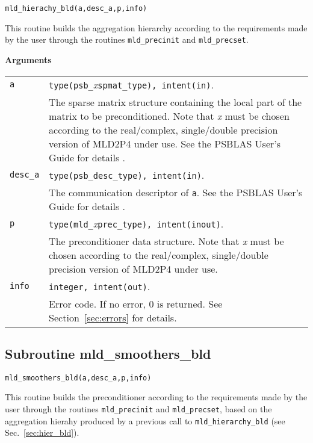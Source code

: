 \begin{center}
\verb|mld_hierachy_bld(a,desc_a,p,info)|\\
\end{center}

\noindent
This routine builds the aggregation hierarchy  according to the requirements made by
the user through the routines \verb|mld_precinit| and \verb|mld_precset|.

{\baselineskip\noindent\large\bfseries Arguments}

\begin{tabular}{p{1.2cm}p{12cm}}
\verb|a|      & \verb|type(psb_|\emph{x}\verb|spmat_type), intent(in)|. \\
              & The sparse matrix structure containing the local part of the
                matrix to be preconditioned. Note that \emph{x} must be chosen according
                to the real/complex, 
single/double precision version of MLD2P4 under use.
                See the PSBLAS User's Guide for details \cite{PSBLASGUIDE}.\\
\verb|desc_a| & \verb|type(psb_desc_type), intent(in)|. \\
              & The communication descriptor of \verb|a|. See the PSBLAS User's Guide for
                details \cite{PSBLASGUIDE}.\\
\verb|p|      & \verb|type(mld_|\emph{x}\verb|prec_type), intent(inout)|.\\
              & The preconditioner data structure. Note that \emph{x} must be chosen according
                to the real/complex, single/double precision version of MLD2P4 under use.\\
\verb|info|   & \verb|integer, intent(out)|.\\
              & Error code. If no error, 0 is returned. See Section~\ref{sec:errors} for details.\\
\end{tabular}


\subsection{Subroutine mld\_smoothers\_bld\label{sec:smoothers_bld}}
  
\begin{center}
\verb|mld_smoothers_bld(a,desc_a,p,info)|\\
\end{center}

\noindent
This routine builds the preconditioner according to the requirements made by
the user through the routines \verb|mld_precinit| and
\verb|mld_precset|, based on the aggregation hierahy produced by a
previous call to \verb|mld_hierarchy_bld| (see
Sec.~\ref{sec:hier_bld}). 

